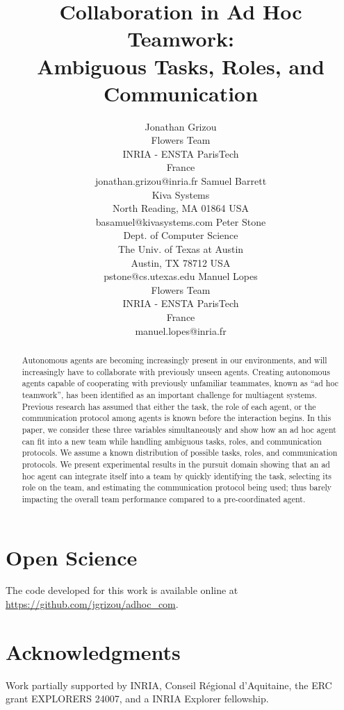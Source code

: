 \documentclass[a4paper]{article}
\title{Collaboration in Ad Hoc Teamwork: \\
Ambiguous Tasks, Roles, and Communication\vspace{1em}}
\author{
Jonathan Grizou \\ Flowers Team \\ INRIA - ENSTA ParisTech \\  France \\ jonathan.grizou@inria.fr
\And
Samuel Barrett \\ Kiva Systems \\ North Reading, MA 01864 USA \\ basamuel@kivasystems.com
\AND
Peter Stone \\ Dept. of Computer Science \\ The Univ. of Texas at Austin \\ Austin, TX 78712 USA \\ pstone@cs.utexas.edu
\And
Manuel Lopes \\ Flowers Team \\ INRIA - ENSTA ParisTech \\  France \\ manuel.lopes@inria.fr
}
\begin{document}
\maketitle

\begin{abstract}
Autonomous agents are becoming increasingly present in our environments, and will increasingly have to collaborate with previously unseen agents. Creating autonomous agents capable of cooperating with previously unfamiliar teammates, known as ``ad hoc teamwork'', has been identified as an important challenge for multiagent systems. Previous research has assumed that either the task, the role of each agent, or the communication protocol among agents is known before the interaction begins. In this paper, we consider these three variables simultaneously and show how an ad hoc agent can fit into a new team while handling ambiguous tasks, roles, and communication protocols. We assume a known distribution of possible tasks, roles, and communication protocols. We present experimental results in the pursuit domain showing that an ad hoc agent can integrate itself into a team by quickly identifying the task, selecting its role on the team, and estimating the communication protocol being used; thus barely impacting the overall team performance compared to a pre-coordinated agent.
\end{abstract}













\section*{Open Science}

The code developed for this work is available online at \url{https://github.com/jgrizou/adhoc_com}.

\section*{Acknowledgments}

Work partially supported by INRIA, Conseil R\'{e}gional d'Aquitaine, the ERC grant EXPLORERS 24007, and a INRIA Explorer fellowship.




\end{document}

